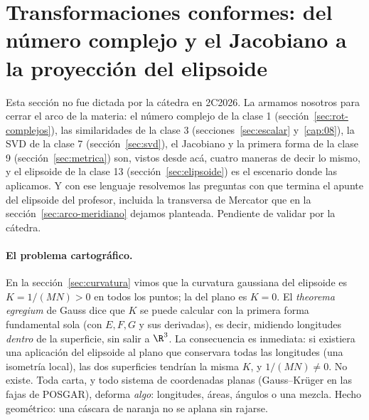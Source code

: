 \section{Transformaciones conformes: del número complejo y el Jacobiano a la proyección del elipsoide}\label{sec:transformaciones-conformes}

{\small\vspace{1mm}\par}
{\small{}\par}


\begin{atencion}
Esta sección no fue dictada por la cátedra en 2C2026. La armamos nosotros para cerrar el
arco de la materia: el número complejo de la clase 1 (sección~\ref{sec:rot-complejos}),
las similaridades de la clase 3 (secciones~\ref{sec:escalar} y~\ref{cap:08}), la SVD de la
clase 7 (sección~\ref{sec:svd}), el Jacobiano y la primera forma de la clase 9
(sección~\ref{sec:metrica}) son, vistos desde acá, cuatro maneras de decir lo mismo, y
el elipsoide de la clase 13 (sección~\ref{sec:elipsoide}) es el escenario donde las
aplicamos. Y
con ese lenguaje resolvemos las preguntas con que termina el apunte del elipsoide del
profesor, incluida la transversa de Mercator que en la sección~\ref{sec:arco-meridiano}
dejamos planteada. Pendiente de validar por la cátedra.
\end{atencion}

\paragraph{El problema cartográfico.} En la sección~\ref{sec:curvatura} vimos que la
curvatura gaussiana del elipsoide es \(K=1/(MN)>0\) en todos los puntos; la del plano es
\(K=0\). El \emph{theorema egregium} de Gauss dice que \(K\) se puede calcular con la
primera forma fundamental sola (con \(E,F,G\) y sus derivadas), es decir, midiendo
longitudes \emph{dentro} de la superficie, sin salir a \(\R^3\). La consecuencia es
inmediata: si existiera una aplicación del elipsoide al plano que conservara todas las
longitudes (una isometría local), las dos superficies tendrían la misma \(K\), y
\(1/(MN)\neq0\). No existe. Toda carta, y todo sistema de coordenadas planas
(Gauss--Krüger en las fajas de POSGAR), deforma \emph{algo}: longitudes, áreas, ángulos o
una mezcla. Hecho geométrico: una cáscara de naranja no se aplana sin rajarse.

